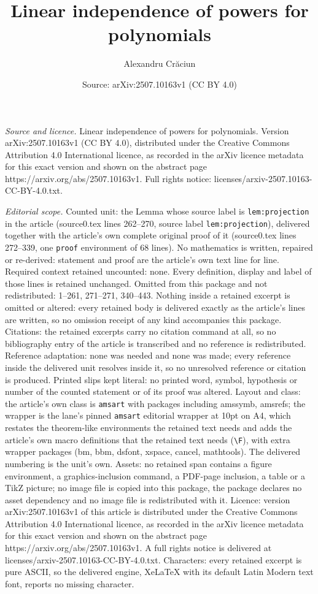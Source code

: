 \documentclass[10pt,a4paper]{amsart}
\title[Linear independence of powers for polynomials]{Linear independence of powers for polynomials}
\author{Alexandru Cr\u{a}ciun}
\date{Source: arXiv:2507.10163v1 (CC BY 4.0)}
\begin{document}
\maketitle

\noindent\emph{Source and licence.} Linear independence of powers for polynomials. Version arXiv:2507.10163v1 (CC BY 4.0), distributed under the Creative Commons Attribution 4.0 International licence, as recorded in the arXiv licence metadata for this exact version and shown on the abstract page https://arxiv.org/abs/2507.10163v1. Full rights notice: licenses/arxiv-2507.10163-CC-BY-4.0.txt.\par\smallskip

\noindent\textit{Editorial scope.} Counted unit: the Lemma whose source label is \texttt{lem:projection} in the article (source0.tex lines 262--270, source label \texttt{lem:projection}), delivered together with the article's own complete original proof of it (source0.tex lines 272--339, one \texttt{proof} environment of 68 lines). No mathematics is written, repaired or re-derived: statement and proof are the article's own text line for line. Required context retained uncounted: none. Every definition, display and label of those lines is retained unchanged. Omitted from this package and not redistributed: 1--261, 271--271, 340--443. Nothing inside a retained excerpt is omitted or altered: every retained body is delivered exactly as the article's lines are written, so no omission receipt of any kind accompanies this package. Citations: the retained excerpts carry no citation command at all, so no bibliography entry of the article is transcribed and no reference is redistributed. Reference adaptation: none was needed and none was made; every reference inside the delivered unit resolves inside it, so no unresolved reference or citation is produced. Printed slips kept literal: no printed word, symbol, hypothesis or number of the counted statement or of its proof was altered. Layout and class: the article's own class is \texttt{amsart} with packages including amssymb, amsrefs; the wrapper is the lane's pinned \texttt{amsart} editorial wrapper at 10pt on A4, which restates the theorem-like environments the retained text needs and adds the article's own macro definitions that the retained text needs (\texttt{\textbackslash F}), with extra wrapper packages (bm, bbm, dsfont, xspace, cancel, mathtools). The delivered numbering is the unit's own. Assets: no retained span contains a figure environment, a graphics-inclusion command, a PDF-page inclusion, a table or a TikZ picture; no image file is copied into this package, the package declares no asset dependency and no image file is redistributed with it. Licence: version arXiv:2507.10163v1 of this article is distributed under the Creative Commons Attribution 4.0 International licence, as recorded in the arXiv licence metadata for this exact version and shown on the abstract page https://arxiv.org/abs/2507.10163v1. A full rights notice is delivered at licenses/arxiv-2507.10163-CC-BY-4.0.txt. Characters: every retained excerpt is pure ASCII, so the delivered engine, XeLaTeX with its default Latin Modern text font, reports no missing character.
\end{document}
